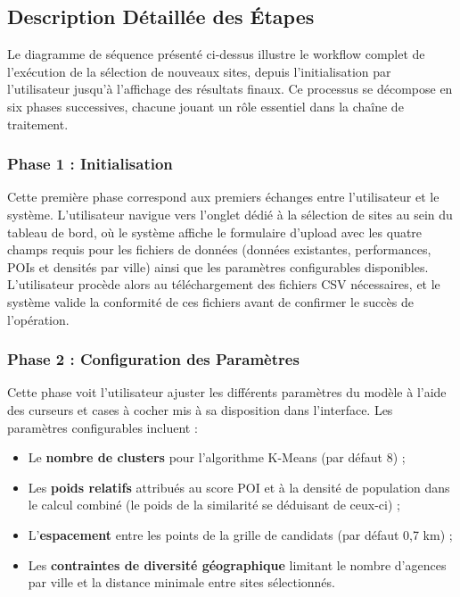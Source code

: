 \documentclass[11pt,a4paper,twoside]{report}
\begin{document}
\FloatBarrier

\subsection{Description Détaillée des Étapes}

Le diagramme de séquence présenté ci-dessus illustre le workflow complet de l'exécution de la sélection de nouveaux sites, depuis l'initialisation par l'utilisateur jusqu'à l'affichage des résultats finaux. Ce processus se décompose en six phases successives, chacune jouant un rôle essentiel dans la chaîne de traitement.

\subsubsection*{Phase 1 : Initialisation}

Cette première phase correspond aux premiers échanges entre l'utilisateur et le système. L'utilisateur navigue vers l'onglet dédié à la sélection de sites au sein du tableau de bord, où le système affiche le formulaire d'upload avec les quatre champs requis pour les fichiers de données (données existantes, performances, POIs et densités par ville) ainsi que les paramètres configurables disponibles. L'utilisateur procède alors au téléchargement des fichiers CSV nécessaires, et le système valide la conformité de ces fichiers avant de confirmer le succès de l'opération.

\subsubsection*{Phase 2 : Configuration des Paramètres}

Cette phase voit l'utilisateur ajuster les différents paramètres du modèle à l'aide des curseurs et cases à cocher mis à sa disposition dans l'interface. Les paramètres configurables incluent :

\begin{itemize}[leftmargin=1.2cm]
    \item Le \textbf{nombre de clusters} pour l'algorithme K-Means (par défaut 8) ;
    \item Les \textbf{poids relatifs} attribués au score POI et à la densité de population dans le calcul combiné (le poids de la similarité se déduisant de ceux-ci) ;
    \item L'\textbf{espacement} entre les points de la grille de candidats (par défaut 0,7 km) ;
    \item Les \textbf{contraintes de diversité géographique} limitant le nombre d'agences par ville et la distance minimale entre sites sélectionnés.
\end{itemize}
\end{document}
